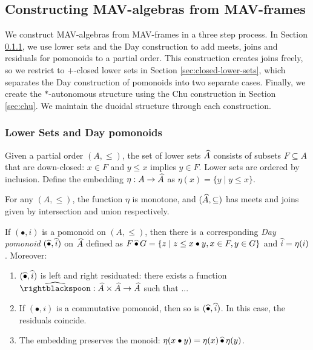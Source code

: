 \subsection{Constructing MAV-algebras from MAV-frames}

We construct MAV-algebras from MAV-frames in a three step process. In
Section \ref{sec:lower-sets}, we use lower sets and the Day
construction to add meets, joins and residuals for pomonoids to a
partial order. This construction creates joins freely, so we restrict
to $+$-closed lower sets in Section \ref{sec:closed-lower-sets}, which
separates the Day construction of pomonoids into two separate
cases. Finally, we create the $*$-autonomous structure using the Chu
construction in Section \ref{sec:chu}. We maintain the duoidal
structure through each construction.

\subsubsection{Lower Sets and Day pomonoids}
\label{sec:lower-sets}

\begin{definition}
  Given a partial order $(A, \leq)$, the set of lower sets
  $\widehat{A}$ consists of subsets $F \subseteq A$ that are
  down-closed: $x \in F$ and $y \leq x$ implies $y \in F$. Lower sets
  are ordered by inclusion. Define the embedding
  $\eta : A \to \widehat{A}$ as $\eta(x) = \{ y \mid y \leq x \}$.
\end{definition}

\begin{proposition}
  For any $(A, \leq)$, the function $\eta$ is monotone, and
  $(\widehat{A}, \subseteq)$ has meets and joins given by
  intersection and union respectively.
%
\end{proposition}

\begin{proposition}\label{prop:day-construction}
  If $(\bullet, i)$ is a pomonoid on $(A, \leq)$, then there is a
  corresponding \emph{Day pomonoid} $(\mathop{\widehat{\bullet}}, \mathop{\widehat{i}})$ on
  $\widehat{A}$ defined as
  $F \mathop{\widehat{\bullet}} G = \{ z \mid z \leq x \bullet y, x \in F, y \in G
  \}$ and $\mathop{\widehat{i}} = \eta(i)$. Moreover:
  \begin{enumerate}
  \item $(\mathop{\widehat{\bullet}}, \mathop{\widehat{i}})$ is left and right residuated: there
    exists a function
    $\Day{\rightblackspoon} : \LowerSet{A} \times \LowerSet{A} \to
    \LowerSet{A}$ such that ... 
  \item If $(\bullet, i)$ is a commutative pomonoid, then so is
    $(\mathop{\widehat{\bullet}}, \mathop{\widehat{i}})$. In this case, the residuals coincide.
  \item The embedding preserves the monoid:
    $\eta(x \bullet y) = \eta(x) \mathop{\widehat{\bullet}} \eta(y)$.
  \end{enumerate}
\end{proposition}

